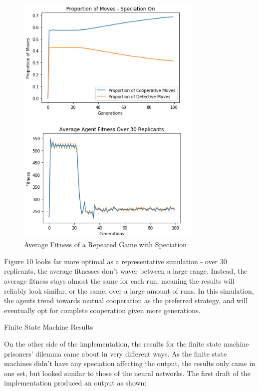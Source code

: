 \documentclass[12pt,a4paper]{article}
\makeatletter
\renewcommand\subsection{\@startsection {subsection}{1}{2mm}
                               {3pt plus 2pt minus 1pt}
                               {3pt plus 0pt}
                               {\normalfont\bfseries}}
\makeatother
\begin{document}
\begin{figure}[H]
	\centering
		\includegraphics[width=0.80\textwidth]{RepeatedFixedFitnessOn}
		\caption{Average Fitness of a Repeated Game with Speciation}
\end{figure}

Figure 10 looks far more optimal as a representative simulation - over 30 replicants, the average fitnesses don't waver between a large range. Instead, the average fitness stays almost the same for each run, meaning the results will reliably look similar, or the same, over a large amount of runs. In this simulation, the agents trend towards mutual cooperation as the preferred strategy, and will eventually opt for complete cooperation given more generations.

\subsection{Finite State Machine Results}

On the other side of the implementation, the results for the finite state machine prisoners' dilemma came about in very different ways. As the finite state machines didn't have any speciation affecting the output, the results only came in one set, but looked similar to those of the neural networks. The first draft of the implementation produced an output as shown:
\end{document}

